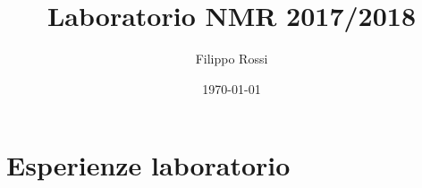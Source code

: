 \documentclass[oneside,12pt,fleqn]{memoir}
\author{Filippo Rossi}
\title{Laboratorio NMR 2017/2018}
\date{\today}
\begin{document}
\maketitle
\tableofcontents*

\part{Esperienze laboratorio}





%

\end{document}
